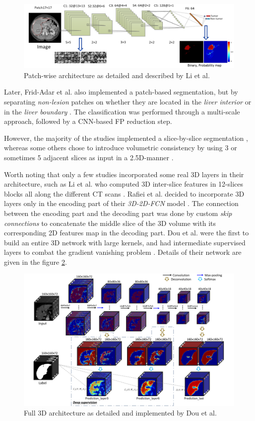 \documentclass[]{article}
\begin{document}
\begin{figure}[th!]
	\centering
	\includegraphics[width=0.7\linewidth]{images/image2}
	\caption{Patch-wise architecture as detailed and described by Li et al. \cite{Li2015}}
	\label{Li2015_Patch_fig}
\end{figure}


Later, Frid-Adar et al. also implemented a patch-based
segmentation, but by separating \emph{non-lesion} patches on whether
they are located in the \emph{liver interior} or in the \emph{liver
	boundary} \cite{Frid-adar2017}. The classification was performed through a multi-scale
approach, followed by a CNN-based FP reduction step.

However, the majority of the studies implemented a slice-by-slice
segmentation \cite{Chlebus2018, Kaluva2018, Bi2017}, whereas some others chose to introduce volumetric
consistency by using 3 or sometimes 5 adjacent slices as input in a
2.5D-manner \cite{Han2017, Yuan2017, Bellver2017}.


Worth noting that only a few studies incorporated some real 3D layers in
their architecture, such as Li et al. who computed 3D
inter-slice features in 12-slices blocks all along the different CT
scans \cite{Li2018}. Rafiei et al. decided to incorporate 3D layers only in
the encoding part of their \emph{3D-2D-FCN} model \cite{Rafiei2018}. The connection
between the encoding part and the decoding part was done by custom
\emph{skip connections} to concatenate the middle slice of the 3D volume
with its corresponding 2D features map in the decoding part. Dou
	et al. were the first to build an entire 3D network with large kernels,
and had intermediate supervised layers to combat the gradient vanishing
problem \cite{Dou2016}. Details of their network are given in the figure \ref{Dou2016_3Darchitecture}.

\begin{figure}[th!]
	\centering
	\includegraphics[width=0.7\linewidth]{images/image30}
	\caption{Full 3D architecture as detailed and implemented by Dou et al. \cite{Dou2016}}
	\label{Dou2016_3Darchitecture}
\end{figure}
\end{document}
